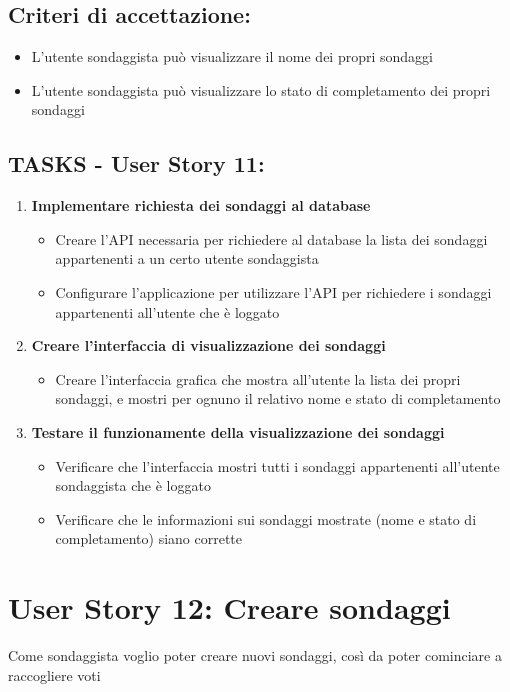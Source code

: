     \subsection*{Criteri di accettazione:}  
    \begin{itemize}  
        \item L'utente sondaggista può visualizzare il nome dei propri sondaggi
        \item L'utente sondaggista può visualizzare lo stato di completamento dei propri sondaggi
    \end{itemize}  
    \subsection*{TASKS - User Story 11:}  
    \begin{enumerate}  
        \item \textbf{Implementare richiesta dei sondaggi al database}  
            \begin{itemize}  
                \item Creare l'API necessaria per richiedere al database la lista dei sondaggi appartenenti a un certo utente sondaggista
                \item Configurare l'applicazione per utilizzare l'API per richiedere i sondaggi appartenenti all'utente che è loggato
            \end{itemize}
        \item \textbf{Creare l'interfaccia di visualizzazione dei sondaggi}  
            \begin{itemize}  
                \item Creare l'interfaccia grafica che mostra all'utente la lista dei propri sondaggi, e mostri per ognuno il relativo nome e stato di completamento
            \end{itemize} 
        \item \textbf{Testare il funzionamente della visualizzazione dei sondaggi}  
            \begin{itemize}  
                \item Verificare che l'interfaccia mostri tutti i sondaggi appartenenti all'utente sondaggista che è loggato
                \item Verificare che le informazioni sui sondaggi mostrate (nome e stato di completamento) siano corrette
            \end{itemize} 
    \end{enumerate}
\section*{User Story 12: Creare sondaggi}
    Come sondaggista voglio poter creare nuovi sondaggi, così da poter cominciare a raccogliere voti
